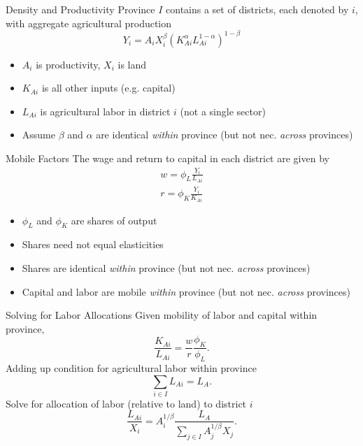 \documentclass[10pt, xcolor=dvipsnames]{beamer}
\begin{document}
\begin{frame}{Density and Productivity}
Province $I$ contains a set of districts, each denoted by $i$, with aggregate agricultural production
\begin{equation}
Y_{i} = A_{i} X_{i}^{\beta} \left(K_{Ai}^{\alpha}L_{Ai}^{1-\alpha}\right)^{1-\beta} \label{EQ_production}
\end{equation}
\begin{itemize}
  \item $A_i$ is productivity, $X_i$ is land
  \item $K_{Ai}$ is all other inputs (e.g. capital)
  \item $L_{Ai}$ is agricultural labor in district $i$ (not a single sector)
  \item Assume $\beta$ and $\alpha$ are identical \textit{within} province (but not nec. \textit{across} provinces)
\end{itemize}
\end{frame}

\begin{frame}{Mobile Factors}
The wage and return to capital in each district are given by 
\begin{eqnarray}
    w = \phi_L \frac{Y_i}{L_{Ai}} \\ \nonumber
    r = \phi_K \frac{Y_i}{K_{Ai}} \label{EQ_factorprices}
\end{eqnarray}
\begin{itemize}
  \item $\phi_L$ and $\phi_K$ are shares of output 
  \item Shares need not equal elasticities
  \item Shares are identical \textit{within} province (but not nec. \textit{across} provinces)
  \item Capital and labor are mobile \textit{within} province (but not nec. \textit{across} provinces)
\end{itemize}
\end{frame}

\begin{frame}{Solving for Labor Allocations}
Given mobility of labor and capital within province,
\begin{equation}
    \frac{K_{Ai}}{L_{Ai}} = \frac{w}{r}\frac{\phi_K}{\phi_L}.
\end{equation}
Adding up condition for agricultural labor within province
\begin{equation}
\sum_{i\in I} L_{Ai} = L_A.
\end{equation}
Solve for allocation of labor (relative to land) to district $i$
\begin{equation}
\frac{L_{Ai}}{X_i} = A_{i}^{1/\beta}\frac{L_A}{\sum_{j\in I} A_{j}^{1/\beta}X_{j}}. \label{EQ_LaX}
\end{equation}
\end{frame}
\end{document}
